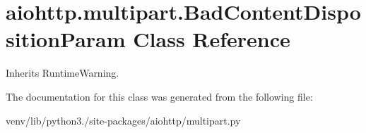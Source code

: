 \hypertarget{classaiohttp_1_1multipart_1_1_bad_content_disposition_param}{}\section{aiohttp.\+multipart.\+Bad\+Content\+Disposition\+Param Class Reference}
\label{classaiohttp_1_1multipart_1_1_bad_content_disposition_param}


Inherits Runtime\+Warning.



The documentation for this class was generated from the following file\+:\begin{DoxyCompactItemize}
\item 
venv/lib/python3./site-\/packages/aiohttp/multipart.\+py\end{DoxyCompactItemize}
